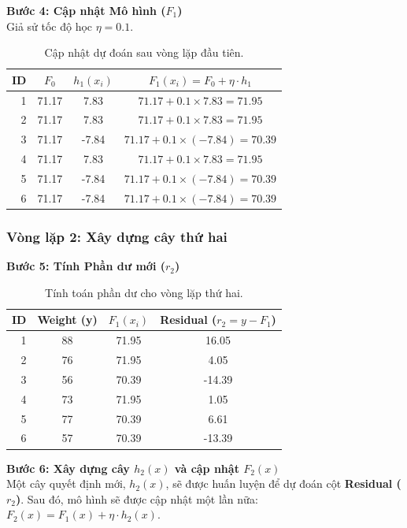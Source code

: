 \textbf{Bước 4: Cập nhật Mô hình ($F_1$)} \\
Giả sử tốc độ học $\eta = 0.1$.
\begin{table}[H]
\centering
\begin{tabular}{rccc}
\toprule
\textbf{ID} & \textbf{$F_0$} & \textbf{$h_1(x_i)$} & \textbf{$F_1(x_i) = F_0 + \eta \cdot h_1$} \\
\midrule
1 & 71.17 & 7.83 & $71.17 + 0.1 \times 7.83 = 71.95$ \\
2 & 71.17 & 7.83 & $71.17 + 0.1 \times 7.83 = 71.95$ \\
3 & 71.17 & -7.84 & $71.17 + 0.1 \times (-7.84) = 70.39$ \\
4 & 71.17 & 7.83 & $71.17 + 0.1 \times 7.83 = 71.95$ \\
5 & 71.17 & -7.84 & $71.17 + 0.1 \times (-7.84) = 70.39$ \\
6 & 71.17 & -7.84 & $71.17 + 0.1 \times (-7.84) = 70.39$ \\
\bottomrule
\end{tabular}
\caption{Cập nhật dự đoán sau vòng lặp đầu tiên.}
\end{table}

\subsubsection{Vòng lặp 2: Xây dựng cây thứ hai}
\textbf{Bước 5: Tính Phần dư mới ($r_2$)}
\begin{table}[H]
\centering
\begin{tabular}{rccc}
\toprule
\textbf{ID} & \textbf{Weight (y)} & \textbf{$F_1(x_i)$} & \textbf{Residual ($r_2 = y - F_1$)} \\
\midrule
1 & 88 & 71.95 & 16.05 \\
2 & 76 & 71.95 & 4.05 \\
3 & 56 & 70.39 & -14.39 \\
4 & 73 & 71.95 & 1.05 \\
5 & 77 & 70.39 & 6.61 \\
6 & 57 & 70.39 & -13.39 \\
\bottomrule
\end{tabular}
\caption{Tính toán phần dư cho vòng lặp thứ hai.}
\end{table}

\textbf{Bước 6: Xây dựng cây $h_2(x)$ và cập nhật $F_2(x)$} \\
Một cây quyết định mới, $h_2(x)$, sẽ được huấn luyện để dự đoán cột \textbf{Residual ($r_2$)}. Sau đó, mô hình sẽ được cập nhật một lần nữa: $F_2(x) = F_1(x) + \eta \cdot h_2(x)$.

